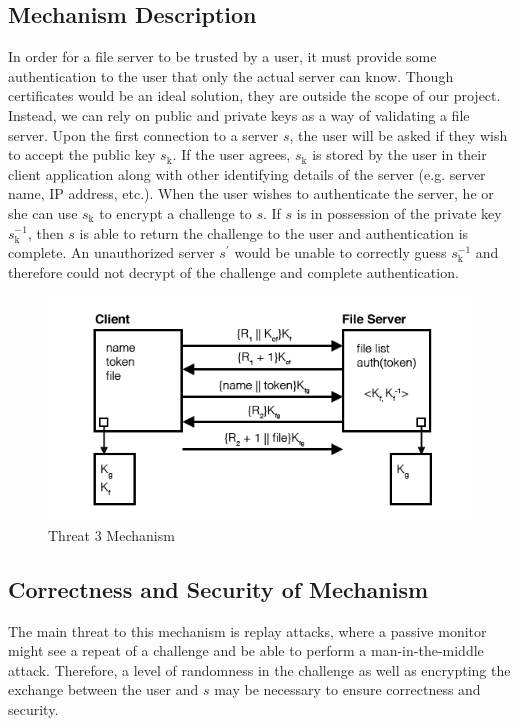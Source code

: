 \documentclass[11pt]{article}
\begin{document}
\subsection{Mechanism Description}
In order for a file server to be trusted by a user, it must provide some authentication to the user that only the actual server can know. Though certificates would be an ideal solution, they are outside the scope of our project. Instead, we can rely on public and private keys as a way of validating a file server. Upon the first connection to a server $s$, the user will be asked if they wish to accept the public key $s_\text{k}$. If the user agrees, $s_\text{k}$ is stored by the user in their client application along with other identifying details of the server (e.g. server name, IP address, etc.). When the user wishes to authenticate the server, he or she can use $s_\text{k}$ to encrypt a challenge to $s$. If $s$ is in possession of the private key $s_\text{k}^{-1}$, then $s$ is able to return the challenge to the user and authentication is complete. An unauthorized server $s^\prime$ would be unable to correctly guess $s_\text{k}^{-1}$ and therefore could not decrypt of the challenge and complete authentication.
\begin{figure}[htbp]
\begin{center}
\includegraphics{threat3}
\caption{Threat 3 Mechanism}
\label{threat3}
\end{center}
\end{figure}
\subsection{Correctness and Security of Mechanism}
The main threat to this mechanism is replay attacks, where a passive monitor might see a repeat of a challenge and be able to perform a man-in-the-middle attack. Therefore, a level of randomness in the challenge as well as encrypting the exchange between the user and $s$ may be necessary to ensure correctness and security.
\end{document}
